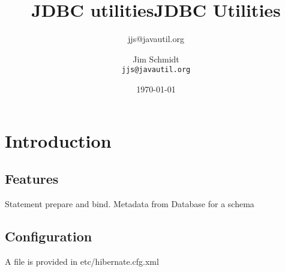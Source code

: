 \documentclass[a4paper,10pt]{book}
\title{JDBC utilities}
\author{jjs@javautil.org}
\begin{document}
\title{JDBC Utilities}
\author{Jim Schmidt\\
  \texttt{jjs@javautil.org}}
\date{\today}
\maketitle
\tableofcontents
\chapter{Introduction}
\section{Features}
Statement prepare and bind.
Metadata from Database for a schema
\section{Configuration}
A file is provided in etc/hibernate.cfg.xml
\end{document}

